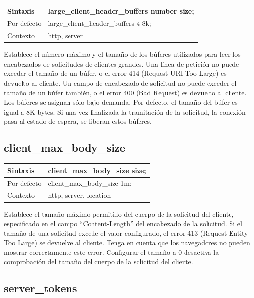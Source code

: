 \begin{table}[H]
\begin{tabular}{|l|l|}
\hline
Sintaxis      & large\_client\_header\_buffers number size; \\ \hline
Por defecto   & large\_client\_header\_buffers 4 8k;     \\ \hline
Contexto      & http, server     \\ \hline
\end{tabular}
\end{table}

Establece el número máximo y el tamaño de los búferes utilizados para leer los encabezados de solicitudes de clientes grandes. Una línea de petición no puede exceder el tamaño de un búfer, o el error 414 (Request-URI Too Large) es devuelto al cliente. Un campo de encabezado de solicitud no puede exceder el tamaño de un búfer también, o el error 400 (Bad Request) es devuelto al cliente. Los búferes se asignan sólo bajo demanda. Por defecto, el tamaño del búfer es igual a 8K bytes. Si una vez finalizada la tramitación de la solicitud, la conexión pasa al estado de espera, se liberan estos búferes.

\subsection{client\_max\_body\_size}

\begin{table}[H]
\begin{tabular}{|l|l|}
\hline
Sintaxis      & client\_max\_body\_size size; \\ \hline
Por defecto   & client\_max\_body\_size 1m;     \\ \hline
Contexto      & http, server, location     \\ \hline
\end{tabular}
\end{table}

Establece el tamaño máximo permitido del cuerpo de la solicitud del cliente, especificado en el campo ``Content-Length'' del encabezado de la solicitud. Si el tamaño de una solicitud excede el valor configurado, el error 413 (Request Entity Too Large) se devuelve al cliente. Tenga en cuenta que los navegadores no pueden mostrar correctamente este error. Configurar el tamaño a 0 desactiva la comprobación del tamaño del cuerpo de la solicitud del cliente.

\subsection{server\_tokens}

